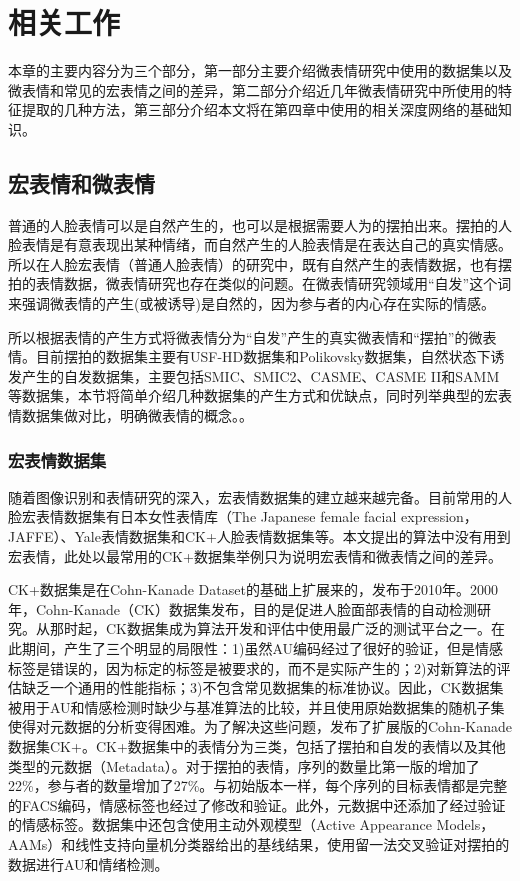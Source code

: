 \chapter{相关工作}\label{chap:relate}

本章的主要内容分为三个部分，第一部分主要介绍微表情研究中使用的数据集以及微表情和常见的宏表情之间的差异，第二部分介绍近几年微表情研究中所使用的特征提取的几种方法，第三部分介绍本文将在第四章中使用的相关深度网络的基础知识。

\section{宏表情和微表情}

普通的人脸表情可以是自然产生的，也可以是根据需要人为的摆拍出来。摆拍的人脸表情是有意表现出某种情绪，而自然产生的人脸表情是在表达自己的真实情感。所以在人脸宏表情（普通人脸表情）的研究中，既有自然产生的表情数据，也有摆拍的表情数据，微表情研究也存在类似的问题。在微表情研究领域用“自发”这个词来强调微表情的产生(或被诱导)是自然的，因为参与者的内心存在实际的情感。

所以根据表情的产生方式将微表情分为“自发”产生的真实微表情和“摆拍”的微表情。目前摆拍的数据集主要有USF-HD数据集和Polikovsky数据集，自然状态下诱发产生的自发数据集，主要包括SMIC、SMIC2、CASME、CASME II和SAMM等数据集，本节将简单介绍几种数据集的产生方式和优缺点，同时列举典型的宏表情数据集做对比，明确微表情的概念。。

\subsection{宏表情数据集}

随着图像识别和表情研究的深入，宏表情数据集的建立越来越完备。目前常用的人脸宏表情数据集有日本女性表情库（The Japanese female facial expression，JAFFE）\citep{Lyons2002Coding}、Yale表情数据集\citep{Belhumeur2002Eigenfaces}和CK+人脸表情数据集\citep{Lucey2010The}等。本文提出的算法中没有用到宏表情，此处以最常用的CK+数据集举例只为说明宏表情和微表情之间的差异。

CK+数据集是在Cohn-Kanade Dataset的基础上扩展来的，发布于2010年。2000年，Cohn-Kanade（CK）数据集发布，目的是促进人脸面部表情的自动检测研究。从那时起，CK数据集成为算法开发和评估中使用最广泛的测试平台之一。在此期间，产生了三个明显的局限性：1)虽然AU编码经过了很好的验证，但是情感标签是错误的，因为标定的标签是被要求的，而不是实际产生的；2)对新算法的评估缺乏一个通用的性能指标；3)不包含常见数据集的标准协议。因此，CK数据集被用于AU和情感检测时缺少与基准算法的比较，并且使用原始数据集的随机子集使得对元数据的分析变得困难。为了解决这些问题，发布了扩展版的Cohn-Kanade数据集CK+。CK+数据集中的表情分为三类，包括了摆拍和自发的表情以及其他类型的元数据（Metadata）。对于摆拍的表情，序列的数量比第一版的增加了22\%，参与者的数量增加了27\%。与初始版本一样，每个序列的目标表情都是完整的FACS编码，情感标签也经过了修改和验证。此外，元数据中还添加了经过验证的情感标签。数据集中还包含使用主动外观模型（Active Appearance Models，AAMs）和线性支持向量机分类器给出的基线结果，使用留一法交叉验证对摆拍的数据进行AU和情绪检测。

